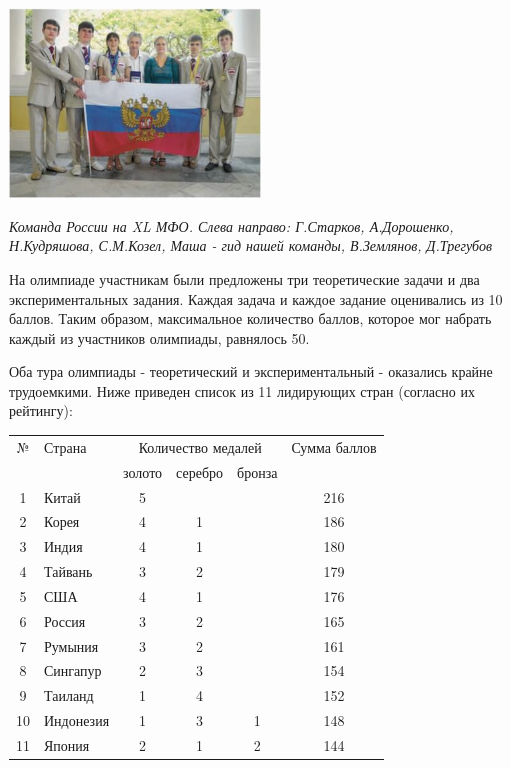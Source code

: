 \begin{multicols*}{2}
    
    \columnbreak

    \begin{center}
        \includegraphics[width=0.5\textwidth]{team.png}
    \end{center}
    \textit{Команда России на XL МФО. Слева направо: Г.Старков, А.Дорошенко, Н.Кудряшова, С.М.Козел, Маша - гид нашей команды, В.Землянов, Д.Трегубов}

    \vspace{10pt}

    На олимпиаде участникам были предложены три теоретические задачи и два экспериментальных задания. Каждая задача и каждое задание оценивались из 10 баллов. Таким образом, максимальное количество баллов, которое мог набрать каждый из участников олимпиады, равнялось 50.

    Оба тура олимпиады - теоретический и экспериментальный - оказались крайне трудоемкими. Ниже приведен список из 11 лидирующих стран (согласно их рейтингу):
    \begin{center}
        \begin{tabular}{clcccc}
            № & Страна & \multicolumn{3}{c}{Количество медалей} & Сумма баллов \\
             & & золото & серебро & бронза & \\
             1 & Китай & 5 & & & 216 \\
             2 & Корея & 4 & 1 & & 186 \\
             3 & Индия & 4 & 1 & & 180 \\
             4 & Тайвань & 3 & 2 & & 179 \\
             5 & США & 4 & 1 & & 176 \\
             6 & Россия & 3 & 2 & & 165 \\
             7 & Румыния & 3 & 2 & & 161 \\
             8 & Сингапур & 2 & 3 & & 154 \\
             9 & Таиланд & 1 & 4 & & 152 \\
             10 & Индонезия & 1 & 3 & 1 & 148 \\
             11 & Япония & 2 & 1 & 2 & 144 \\
        \end{tabular}
    \end{center}


\end{multicols*}
